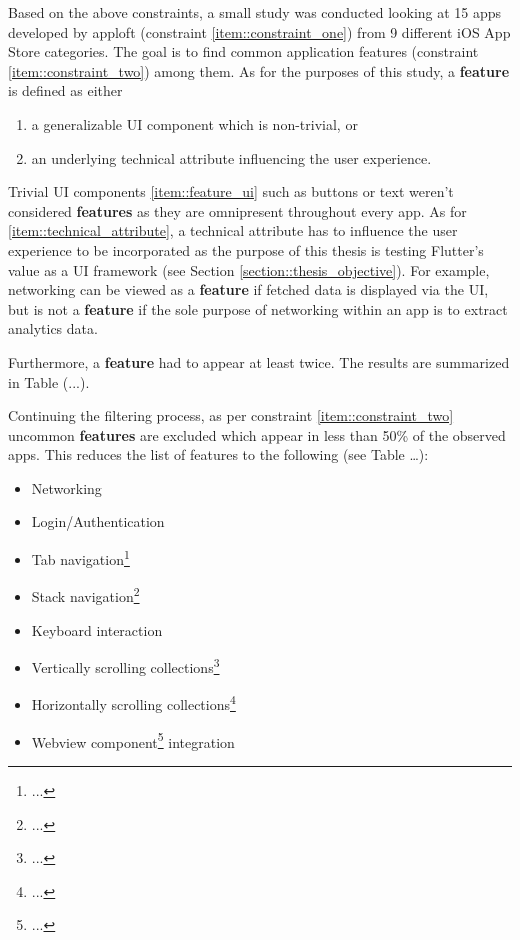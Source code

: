 Based on the above constraints, a small study was conducted looking at 15 apps developed by apploft (constraint \ref{item::constraint_one}) from 9 different iOS App Store categories. 
The goal is to find common application features (constraint \ref{item::constraint_two}) among them.
As for the purposes of this study, a \textbf{feature} is defined as either 
\begin{enumerate}[label=(\alph*)]
    \item a generalizable UI component which is non-trivial, or \label{item::feature_ui}
    \item an underlying technical attribute influencing the user experience. \label{item::technical_attribute}
\end{enumerate}

Trivial UI components \ref{item::feature_ui} such as buttons or text weren't considered \textbf{features} as they are omnipresent throughout every app.
As for \ref{item::technical_attribute}, a technical attribute has to influence the user experience to be incorporated as the purpose of this thesis is testing Flutter's value as a UI framework (see Section \ref{section::thesis_objective}).
For example, networking can be viewed as a \textbf{feature} if fetched data is displayed via the UI, but is not a \textbf{feature} if the sole purpose of networking within 
an app is to extract analytics data.

Furthermore, a \textbf{feature} had to appear at least twice. The results are summarized in Table (...).

Continuing the filtering process, as per constraint \ref{item::constraint_two} uncommon \textbf{features} are excluded which appear in less than 50\% of the 
observed apps. 
This reduces the list of features to the following (see Table \dots):

\begin{itemize}
    \item Networking
    \item Login/Authentication
    \item Tab navigation\footnote{...}
    \item Stack navigation\footnote{...}
    \item Keyboard interaction
    \item Vertically scrolling collections\footnote{...}
    \item Horizontally scrolling collections\footnote{...}
    \item Webview component\footnote{...} integration
\end{itemize}

